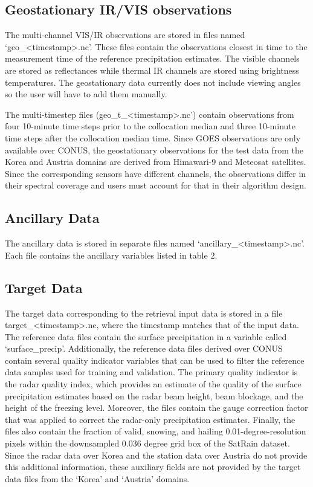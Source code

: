\documentclass[11pt]{article}
\begin{document}
\subsection{Geostationary IR/VIS observations}

The multi-channel VIS/IR observations are stored in files named
‘geo\_<timestamp>.nc’. These files contain the observations closest in time to
the measurement time of the reference precipitation estimates. The visible
channels are stored as reflectances while thermal IR channels are stored using
brightness temperatures. The geostationary data currently does not include
viewing angles so the user will have to add them manually.

The multi-timestep files (geo\_t\_<timestamp>.nc’) contain observations from four
10-minute time steps prior to the collocation median and three 10-minute time
steps after the collocation median time. Since GOES observations are only
available over CONUS, the geostationary observations for the test data from the
Korea and Austria domains are derived from Himawari-9 and Meteosat satellites.
Since the corresponding sensors have different channels, the observations differ
in their spectral coverage and users must account for that in their algorithm
design.

\subsection{Ancillary Data}

The ancillary data is stored in separate files named ‘ancillary\_<timestamp>.nc’.
Each file contains the ancillary variables listed in table 2.


\subsection{Target Data}

The target data corresponding to the retrieval input data is stored in a file
target\_<timestamp>.nc, where the timestamp matches that of the input data. The
reference data files contain the surface precipitation in a variable called
‘surface\_precip’. Additionally, the reference data files derived over CONUS
contain several quality indicator variables that can be used to filter the
reference data samples used for training and validation. The primary quality
indicator is the radar quality index, which provides an estimate of the quality
of the surface precipitation estimates based on the radar beam height, beam
blockage, and the height of the freezing level. Moreover, the files contain the
gauge correction factor that was applied to correct the radar-only precipitation
estimates. Finally, the files also contain the fraction of valid, snowing, and
hailing 0.01-degree-resolution pixels within the downsampled 0.036 degree grid
box of the SatRain dataset. Since the radar data over Korea and the station data
over Austria do not provide this additional information, these auxiliary fields
are not provided by the target data files from the ‘Korea’ and ‘Austria’
domains.
\end{document}
